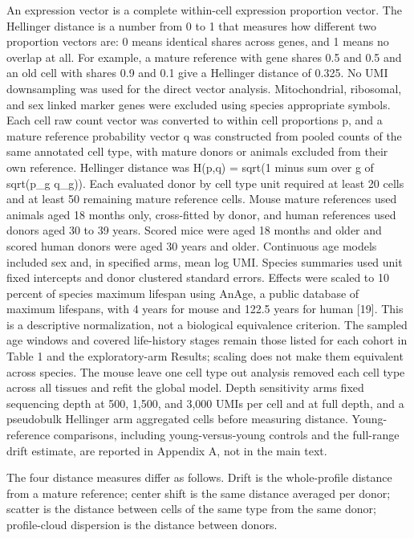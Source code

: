 \documentclass[11pt]{article}
\begin{document}
An expression vector is a complete within-cell expression proportion vector. The Hellinger distance is a number from 0 to 1 that measures how different two proportion vectors are: 0 means identical shares across genes, and 1 means no overlap at all. For example, a mature reference with gene shares 0.5 and 0.5 and an old cell with shares 0.9 and 0.1 give a Hellinger distance of 0.325. No UMI downsampling was used for the direct vector analysis. Mitochondrial, ribosomal, and sex linked marker genes were excluded using species appropriate symbols. Each cell raw count vector was converted to within cell proportions p, and a mature reference probability vector q was constructed from pooled counts of the same annotated cell type, with mature donors or animals excluded from their own reference. Hellinger distance was H(p,q) = sqrt(1 minus sum over g of sqrt(p\_g q\_g)). Each evaluated donor by cell type unit required at least 20 cells and at least 50 remaining mature reference cells. Mouse mature references used animals aged 18 months only, cross-fitted by donor, and human references used donors aged 30 to 39 years. Scored mice were aged 18 months and older and scored human donors were aged 30 years and older. Continuous age models included sex and, in specified arms, mean log UMI. Species summaries used unit fixed intercepts and donor clustered standard errors. Effects were scaled to 10 percent of species maximum lifespan using AnAge, a public database of maximum lifespans, with 4 years for mouse and 122.5 years for human [19]. This is a descriptive normalization, not a biological equivalence criterion. The sampled age windows and covered life-history stages remain those listed for each cohort in Table 1 and the exploratory-arm Results; scaling does not make them equivalent across species. The mouse leave one cell type out analysis removed each cell type across all tissues and refit the global model. Depth sensitivity arms fixed sequencing depth at 500, 1,500, and 3,000 UMIs per cell and at full depth, and a pseudobulk Hellinger arm aggregated cells before measuring distance. Young-reference comparisons, including young-versus-young controls and the full-range drift estimate, are reported in Appendix A, not in the main text.


The four distance measures differ as follows. Drift is the whole-profile distance from a mature reference; center shift is the same distance averaged per donor; scatter is the distance between cells of the same type from the same donor; profile-cloud dispersion is the distance between donors.
\end{document}
